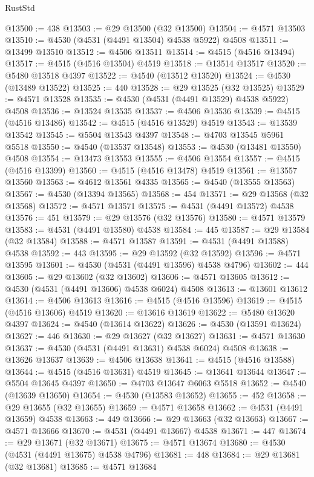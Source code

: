 \begin{lexlean}{RustStd}
\begin{coremodule}
{\begin{coremodule}
{{{{{{{{{{{{{{{{{{{{{{{{{{{{{{{{{{{{{{{{{{{{{{{{{{{{{{{@13500 := 438
@13503 := @29 @13500 (@32 @13500)
@13504 := @4571 @13503
@13510 := @4530 (@4531 (@4491 @13504) @4538 @5922) @4508
@13511 := @13499 @13510
@13512 := @4506 @13511
@13514 := @4515 (@4516 @13494)
@13517 := @4515 (@4516 @13504) @4519
@13518 := @13514 @13517
@13520 := @5480 @13518 @4397
@13522 := @4540 (@13512 @13520)
@13524 := @4530 (@13489 @13522)
@13525 := 440
@13528 := @29 @13525 (@32 @13525)
@13529 := @4571 @13528
@13535 := @4530 (@4531 (@4491 @13529) @4538 @5922) @4508
@13536 := @13524 @13535
@13537 := @4506 @13536
@13539 := @4515 (@4516 @13486)
@13542 := @4515 (@4516 @13529) @4519
@13543 := @13539 @13542
@13545 := @5504 @13543 @4397
@13548 := @4703 @13545 @5961 @5518
@13550 := @4540 (@13537 @13548)
@13553 := @4530 (@13481 @13550) @4508
@13554 := @13473 @13553
@13555 := @4506 @13554
@13557 := @4515 (@4516 @13399)
@13560 := @4515 (@4516 @13478) @4519
@13561 := @13557 @13560
@13563 := @4612 @13561 @4335
@13565 := @4540 (@13555 @13563)
@13567 := @4530 (@13394 @13565)
@13568 := 454
@13571 := @29 @13568 (@32 @13568)
@13572 := @4571 @13571
@13575 := @4531 (@4491 @13572) @4538
@13576 := 451
@13579 := @29 @13576 (@32 @13576)
@13580 := @4571 @13579
@13583 := @4531 (@4491 @13580) @4538
@13584 := 445
@13587 := @29 @13584 (@32 @13584)
@13588 := @4571 @13587
@13591 := @4531 (@4491 @13588) @4538
@13592 := 443
@13595 := @29 @13592 (@32 @13592)
@13596 := @4571 @13595
@13601 := @4530 (@4531 (@4491 @13596) @4538 @4796)
@13602 := 444
@13605 := @29 @13602 (@32 @13602)
@13606 := @4571 @13605
@13612 := @4530 (@4531 (@4491 @13606) @4538 @6024) @4508
@13613 := @13601 @13612
@13614 := @4506 @13613
@13616 := @4515 (@4516 @13596)
@13619 := @4515 (@4516 @13606) @4519
@13620 := @13616 @13619
@13622 := @5480 @13620 @4397
@13624 := @4540 (@13614 @13622)
@13626 := @4530 (@13591 @13624)
@13627 := 446
@13630 := @29 @13627 (@32 @13627)
@13631 := @4571 @13630
@13637 := @4530 (@4531 (@4491 @13631) @4538 @6024) @4508
@13638 := @13626 @13637
@13639 := @4506 @13638
@13641 := @4515 (@4516 @13588)
@13644 := @4515 (@4516 @13631) @4519
@13645 := @13641 @13644
@13647 := @5504 @13645 @4397
@13650 := @4703 @13647 @6063 @5518
@13652 := @4540 (@13639 @13650)
@13654 := @4530 (@13583 @13652)
@13655 := 452
@13658 := @29 @13655 (@32 @13655)
@13659 := @4571 @13658
@13662 := @4531 (@4491 @13659) @4538
@13663 := 449
@13666 := @29 @13663 (@32 @13663)
@13667 := @4571 @13666
@13670 := @4531 (@4491 @13667) @4538
@13671 := 447
@13674 := @29 @13671 (@32 @13671)
@13675 := @4571 @13674
@13680 := @4530 (@4531 (@4491 @13675) @4538 @4796)
@13681 := 448
@13684 := @29 @13681 (@32 @13681)
@13685 := @4571 @13684
}}}}}}}}}}}}}}}}}}}}}}}}}}}}}}}}}}}}}}}}}}}}}}}}}}}}}}}
\end{coremodule}}
\end{coremodule}
\end{lexlean}
